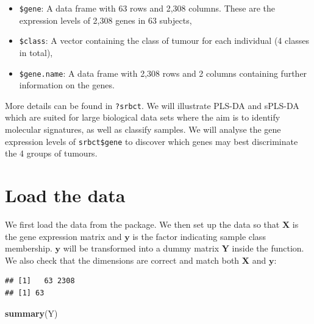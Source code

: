 \documentclass[]{book}
\newenvironment{Shaded}{\begin{snugshade}}{\end{snugshade}}
\newcommand{\CommentTok}[1]{\textcolor[rgb]{0.56,0.35,0.01}{\textit{#1}}}
\newcommand{\KeywordTok}[1]{\textcolor[rgb]{0.13,0.29,0.53}{\textbf{#1}}}
\newcommand{\NormalTok}[1]{#1}
\newcommand{\OperatorTok}[1]{\textcolor[rgb]{0.81,0.36,0.00}{\textbf{#1}}}
\newcommand{\StringTok}[1]{\textcolor[rgb]{0.31,0.60,0.02}{#1}}
\begin{document}
\begin{itemize}
\item
  \texttt{\$gene}: A data frame with 63 rows and 2,308 columns. These are the expression levels of 2,308 genes in 63 subjects,
\item
  \texttt{\$class}: A vector containing the class of tumour for each individual (4 classes in total),
\item
  \texttt{\$gene.name}: A data frame with 2,308 rows and 2 columns containing further information on the genes.
\end{itemize}

More details can be found in \texttt{?srbct}. We will illustrate PLS-DA and sPLS-DA which are suited for large biological data sets where the aim is to identify molecular signatures, as well as classify samples. We will analyse the gene expression levels of \texttt{srbct\$gene} to discover which genes may best discriminate the 4 groups of tumours.

\hypertarget{plsda:load}{%
\section{Load the data}\label{plsda:load}}

We first load the data from the package. We then set up the data so that \(\boldsymbol X\) is the gene expression matrix and \(\boldsymbol y\) is the factor indicating sample class membership. \(\boldsymbol y\) will be transformed into a dummy matrix \(\boldsymbol Y\) inside the function. We also check that the dimensions are correct and match both \(\boldsymbol X\) and \(\boldsymbol y\):

\begin{Shaded}
\end{Shaded}

\begin{verbatim}
## [1]   63 2308
## [1] 63
\end{verbatim}

\begin{Shaded}
\begin{Highlighting}[]
\KeywordTok{summary}\NormalTok{(Y)}
\end{Highlighting}
\end{Shaded}
\end{document}
